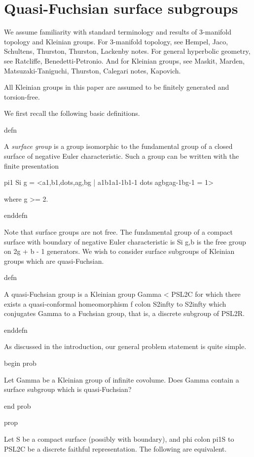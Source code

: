 \section{Quasi-Fuchsian surface subgroups}

We assume familiarity with standard terminology and results of 3-manifold
topology and Kleinian groups.  For 3-manifold topology, see Hempel, Jaco,
Schultens, Thurston, Thurston, Lackenby notes. For general hyperbolic geometry,
see Ratcliffe, Benedetti-Petronio. And for Kleinian groups, see Maskit, Marden,
Matsuzaki-Taniguchi, Thurston, Calegari notes, Kapovich.

All Kleinian groups in this paper are assumed to be finitely generated and
torsion-free.

We first recall the following basic definitions.

defn

A \emph{surface group} is a group isomorphic to the fundamental group of
a closed surface of negative Euler characteristic. Such a group can be written
with the finite presentation

pi1 Si g = <a1,b1,dots,ag,bg | a1b1a1-1b1-1 dots agbgag-1bg-1 = 1>

where g >= 2.

enddefn

Note that surface groups are not free. The fundamental group of a compact
surface with boundary of negative Euler characteristic is Si g,b is the free
group on 2g + b - 1 generators. We wish to consider surface subgroups of
Kleinian groups which are quasi-Fuchsian.

defn

A {quasi-Fuchsian group} is a Kleinian group Gamma < PSL2C for which there
exists a quasi-conformal homeomorphism f colon S2infty to S2infty which
conjugates Gamma to a Fuchsian group, that is, a discrete subgroup of PSL2R.

enddefn

As discussed in the introduction, our general problem statement is quite
simple.

begin prob

Let Gamma be a Kleinian group of infinite covolume. Does Gamma contain
a surface subgroup which is quasi-Fuchsian?

end prob


prop

Let S be a compact surface (possibly with boundary), and phi colon pi1S to
PSL2C be a discrete faithful representation. The following are equivalent.

